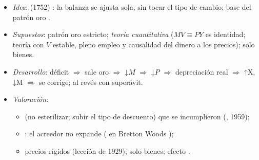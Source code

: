 \documentclass{article}
\begin{document}
\begin{columnas}
\begin{itemize}
\item \emph{Idea}:  (1752) : la balanza se ajusta sola, sin tocar el tipo de cambio; base del patrón oro .
\item \emph{Supuestos}: patrón oro estricto; \emph{teoría cuantitativa} ($MV\equiv PY$ es identidad; teoría con $V$ estable, pleno empleo y causalidad del dinero a los precios); solo bienes.
\item \emph{Desarrollo}: déficit $\Rightarrow$ sale oro $\Rightarrow$ ↓$M$ $\Rightarrow$ ↓$P$ $\Rightarrow$ depreciación real $\Rightarrow$ ↑X, ↓M $\Rightarrow$ se corrige; al revés con superávit.
\end{itemize}
\begin{itemize}
\item \emph{Valoración}:
  \begin{itemize}
  \item {} (no esterilizar; subir el tipo de descuento) que se incumplieron (, 1959);
  \item {}: el acreedor no expande ( en Bretton Woods );
  \item precios rígidos (lección de 1929); solo bienes; efecto .
  \end{itemize}
\end{itemize}


\end{columnas}
\end{document}
